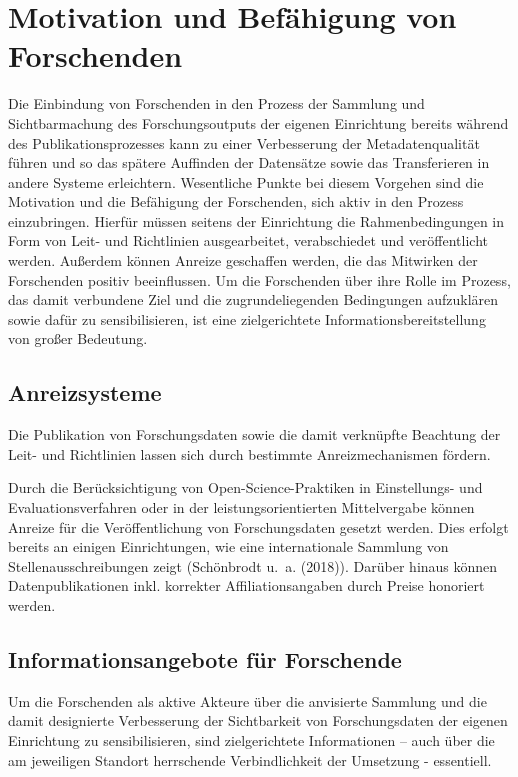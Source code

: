 \documentclass[
  ngerman,
  letterpaper,
  DIV=11]{scrreprt}
\begin{document}
\section{Motivation und Befähigung von
Forschenden}\label{motivation-und-befuxe4higung-von-forschenden}

Die Einbindung von Forschenden in den Prozess der Sammlung und
Sichtbarmachung des Forschungsoutputs der eigenen Einrichtung bereits
während des Publikationsprozesses kann zu einer Verbesserung der
Metadatenqualität führen und so das spätere Auffinden der Datensätze
sowie das Transferieren in andere Systeme erleichtern. Wesentliche
Punkte bei diesem Vorgehen sind die Motivation und die Befähigung der
Forschenden, sich aktiv in den Prozess einzubringen. Hierfür müssen
seitens der Einrichtung die Rahmenbedingungen in Form von Leit- und
Richtlinien ausgearbeitet, verabschiedet und veröffentlicht werden.
Außerdem können Anreize geschaffen werden, die das Mitwirken der
Forschenden positiv beeinflussen. Um die Forschenden über ihre Rolle im
Prozess, das damit verbundene Ziel und die zugrundeliegenden Bedingungen
aufzuklären sowie dafür zu sensibilisieren, ist eine zielgerichtete
Informationsbereitstellung von großer Bedeutung.

\subsection{Anreizsysteme}\label{anreizsysteme}

Die Publikation von Forschungsdaten sowie die damit verknüpfte Beachtung
der Leit- und Richtlinien lassen sich durch bestimmte Anreizmechanismen
fördern.

Durch die Berücksichtigung von Open-Science-Praktiken in Einstellungs-
und Evaluationsverfahren oder in der leistungsorientierten Mittelvergabe
können Anreize für die Veröffentlichung von Forschungsdaten gesetzt
werden. Dies erfolgt bereits an einigen Einrichtungen, wie eine
internationale Sammlung von Stellenausschreibungen zeigt (Schönbrodt
u.~a. (2018)). Darüber hinaus können Datenpublikationen inkl. korrekter
Affiliationsangaben durch Preise honoriert werden.

\subsection{Informationsangebote für
Forschende}\label{informationsangebote-fuxfcr-forschende}

Um die Forschenden als aktive Akteure über die anvisierte Sammlung und
die damit designierte Verbesserung der Sichtbarkeit von Forschungsdaten
der eigenen Einrichtung zu sensibilisieren, sind zielgerichtete
Informationen -- auch über die am jeweiligen Standort herrschende
Verbindlichkeit der Umsetzung - essentiell.
\end{document}
